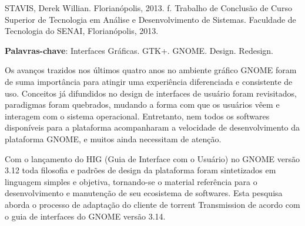\noindent STAVIS, Derek Willian. \textbf{\imprimirtitulo} Florianópolis, 2013.
\pageref{nropaginas}f. Trabalho de Conclusão de Curso Superior de Tecnologia em
Análise e Desenvolvimento de Sistemas. Faculdade de Tecnologia do SENAI,
Florianópolis, 2013.

\vspace{1cm}
\setlength{\absparsep}{18pt} %
\begin{resumo}

 \textbf{Palavras-chave}: Interfaces Gráficas. GTK+. GNOME. Design. Redesign.
 
  Os avanços trazidos nos últimos quatro anos no ambiente gráfico GNOME foram de
  suma importância para atingir uma experiência diferenciada e consistente de
  uso. Conceitos já difundidos no design de interfaces de usuário foram
  revisitados, paradigmas foram quebrados, mudando a forma com que os usuários
  vêem e interagem com o sistema operacional. Entretanto, nem todos os softwares
  disponíveis para a plataforma acompanharam a velocidade de desenvolvimento da
  plataforma GNOME, e muitos ainda necessitam de atenção.
  
  Com o lançamento do HIG (Guia de Interface com o Usuário) no GNOME versão 3.12
  toda filosofia e padrões de design da plataforma foram sintetizados em
  linguagem simples e objetiva, tornando-se o material referência para o
  desenvolvimento e manutenção de seu ecosistema de softwares. Esta pesquisa
  aborda o processo de adaptação do cliente de torrent Transmission de acordo
  com o guia de interfaces do GNOME versão 3.14.

 
\end{resumo}
